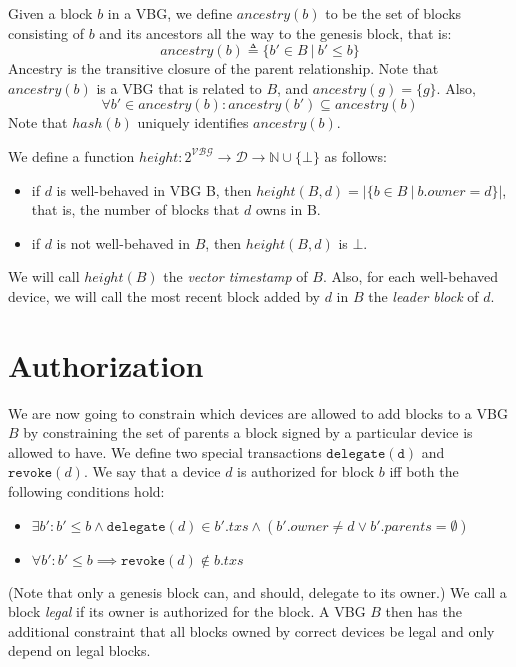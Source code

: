 \documentclass{article}
\begin{document}
Given a block $b$ in a VBG, we define $\mathit{ancestry}(b)$
to be the set of blocks consisting of $b$ and its ancestors all the way to the genesis block, that is:
\begin{equation*}
\mathit{ancestry}(b) \triangleq \{ b' \in B ~|~ b' \leq b \}
\end{equation*}
Ancestry is the transitive closure of the parent relationship.
Note that $\mathit{ancestry}(b)$ is a VBG that is related to $B$, and
$\mathit{ancestry}(g) = \{ g \}$.  Also,
\begin{equation*}
\forall b' \in \mathit{ancestry}(b): \mathit{ancestry}(b') \subseteq \mathit{ancestry}(b)
\end{equation*}
Note that $\mathit{hash}(b)$ uniquely identifies $\mathit{ancestry}(b)$.

We define a function $\mathit{height} : 2^\mathcal{VBG} \rightarrow \mathcal{D} \rightarrow \mathbb{N} \cup \{ \bot \}$
as follows:
\begin{itemize}
\item if $d$ is well-behaved in VBG B, then $\mathit{height}(B, d) = |\{ b \in B ~|~ b.\textit{owner} = d \}|$, that is, the number of blocks that $d$ owns in B.
\item if $d$ is not well-behaved in $B$, then $\mathit{height}(B, d)$ is $\bot$.
\end{itemize}

We will call $\mathit{height}(B)$ the \emph{vector timestamp} of $B$.
Also, for each well-behaved device, we will call the most recent block added by $d$ in $B$ the
\emph{leader block} of $d$.

\section{Authorization}

We are now going to constrain which devices are allowed to add blocks to a VBG $B$ by constraining
the set of parents a block signed by a particular device is allowed to have.
We define two special transactions $\mathtt{delegate(d)}$ and $\mathtt{revoke}(d)$.
We say that a device $d$ is authorized for block $b$ iff both the following
conditions hold:
\begin{itemize}
\item $\exists b': b' \leq b \wedge \mathtt{delegate}(d) \in b'.\mathit{txs} \wedge (b'.\mathit{owner} \ne d \vee b'.\mathit{parents} = \emptyset)$
\item $\forall b': b' \leq b \implies \mathtt{revoke}(d) \notin b.\mathit{txs}$
\end{itemize}
(Note that only a genesis block can, and should, delegate to its owner.)
We call a block \emph{legal} if its owner is authorized for the block.
A VBG $B$ then has the additional constraint that all blocks owned by correct devices be legal and
only depend on legal blocks.
\end{document}
